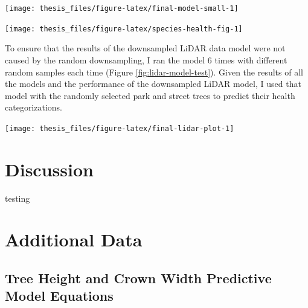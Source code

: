 \documentclass[12pt,twoside]{reedthesis}
\begin{document}
\texttt{[image: thesis\_files/figure-latex/final-model-small-1]}

\texttt{[image: thesis\_files/figure-latex/species-health-fig-1]}

To ensure that the results of the downsampled LiDAR data model were not caused by the random downsampling, I ran the model 6 times with different random samples each time (Figure \ref{fig:lidar-model-test}). Given the results of all the models and the performance of the downsampled LiDAR model, I used that model with the randomly selected park and street trees to predict their health categorizations.

\texttt{[image: thesis\_files/figure-latex/final-lidar-plot-1]}

\hypertarget{discussion}{%
\chapter{Discussion}\label{discussion}}

testing

\appendix

\hypertarget{data}{%
\chapter{Additional Data}\label{data}}

\hypertarget{tree-model-eqs}{%
\section{Tree Height and Crown Width Predictive Model Equations}\label{tree-model-eqs}}
\end{document}
